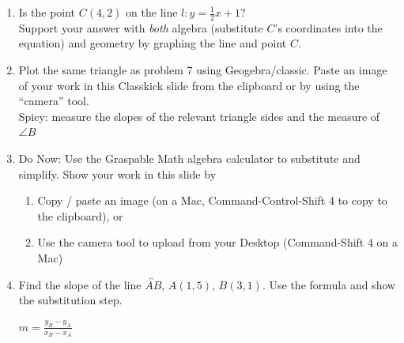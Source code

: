 \begin{enumerate}
\item Is the point $C(4,2)$ on the line $l: y=\frac{1}{2}x+1$? \\[0.5cm]
Support your answer with \emph{both} algebra (substitute $C$'s coordinates into the equation) and geometry by graphing the line and point $C$.
  \begin{flushright}
  \end{flushright}
      
\item Plot the same triangle as problem 7 using Geogebra/classic. Paste an image of your work in this Classkick slide from the clipboard or by using the ``camera'' tool.\\[0.25cm]
Spicy: measure the slopes of the relevant triangle sides and the measure of $\angle B$

\item Do Now: Use the Graspable Math algebra calculator to substitute and simplify. Show your work in this slide by
\begin{enumerate}
  \item Copy / paste an image (on a Mac, Command-Control-Shift 4 to copy to the clipboard), or
  \item Use the camera tool to upload from your Desktop (Command-Shift 4 on a Mac)
\end{enumerate}

\item Find the slope of the line $\overleftrightarrow{AB}$, $A(1,5)$, $B(3,1)$. Use the formula and show the substitution step.
\begin{multicols}{2}
  $\displaystyle m = \frac{y_B - y_A}{x_B - x_A}$
    \vspace{2cm}
    \begin{flushright}
    \end{flushright}
\end{multicols}


\end{enumerate}
